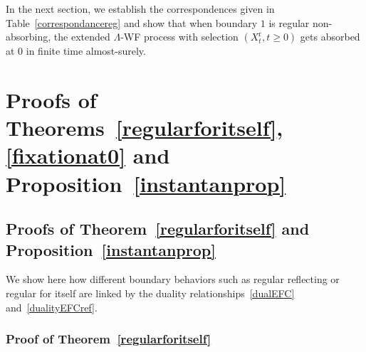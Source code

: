 \documentclass[10pt]{amsart}
\theoremstyle{definition}\newtheorem{defi}[theo]{Definition}\newtheorem{rema}[theo]{Remark}\newtheorem{exam}[theo]{Example}\newtheorem{exem}[theo]{Example}\newtheorem{nota}[theo]{Notation}
\newcommand{\rmr}{\mathrm{r}}
\begin{document}
In the next section, we establish the correspondences given in Table~\ref{correspondancereg} and show that when boundary $1$ is regular non-absorbing, the extended $\Lambda$-WF process with selection $(X_t^{\rmr},t\geq 0)$ gets absorbed at $0$ in finite time almost-surely.


\section{Proofs of Theorems~\ref{regularforitself}, \ref{fixationat0} and Proposition~\ref{instantanprop}}\label{sec3}


\subsection{Proofs of Theorem~\ref{regularforitself} and Proposition~\ref{instantanprop}}

We show here how different boundary behaviors such as regular reflecting or regular for itself are linked by the duality relationships~\eqref{dualEFC} and~\eqref{dualityEFCref}.


\subsubsection{Proof of Theorem~\ref{regularforitself}}
\end{document}
